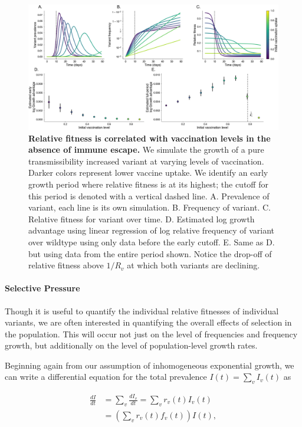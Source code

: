 \documentclass[12pt,oneside,letterpaper]{article}
\begin{document}
\begin{figure}[h]
    \centering
    \includegraphics[width=0.8\linewidth]{./figures/correlation_not_mechanism.png}
    \caption{\textbf{Relative fitness is correlated with vaccination levels in the absence of immune escape.}
    We simulate the growth of a pure transmissibility increased variant at varying levels of vaccination.
    Darker colors represent lower vaccine uptake.
    We identify an early growth period where relative fitness is at its highest; the cutoff for this period is denoted with a vertical dashed line.
        A. Prevalence of variant, each line is its own simulation.
        B. Frequency of variant.
        C. Relative fitness for variant over time.
        D. Estimated log growth advantage using linear regression of log relative frequency of variant over wildtype using only data before the early cutoff.
        E. Same as D. but using data from the entire period shown. Notice the drop-off of relative fitness above $1 / R_{v}$ at which both variants are declining.
    }
\label{fig:mechanism_identification}
\end{figure}

\paragraph{Selective Pressure}

Though it is useful to quantify the individual relative fitnesses of individual variants, we are often interested in quantifying the overall effects of selection in the population.
This will occur not just on the level of frequencies and frequency growth, but additionally on the level of population-level growth rates.

Beginning again from our assumption of inhomogeneous exponential growth, we can write a differential equation for the total prevalence $I(t)= \sum_{v} I_{v}(t)$ as

\begin{align*}
    \frac{d I}{d t} &= \sum_{v} \frac{d I_{v}}{d t} =  \sum_{v} r_{v}(t) I_{v}(t)\\
                    &= \left( \sum_{v} r_{v}(t) f_{v}(t) \right) I(t),
\end{align*}
\end{document}
